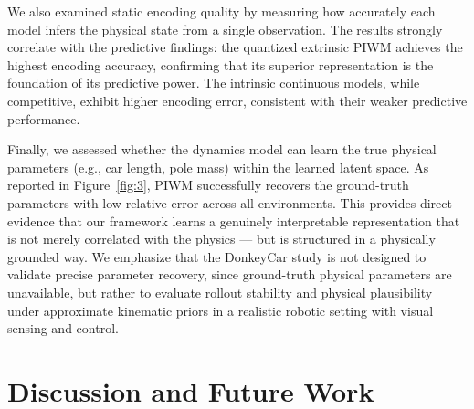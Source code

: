 \documentclass[nonacm,sigconf]{acmart}
\begin{document}
We also examined static encoding quality by measuring how accurately each model infers the physical state from a single observation. The results strongly correlate with the predictive findings: the quantized extrinsic PIWM achieves the highest encoding accuracy, confirming that its superior representation is the foundation of its predictive power. The intrinsic continuous models, while competitive, exhibit higher encoding error, consistent with their weaker predictive performance.

Finally, we assessed whether the dynamics model can learn the true physical parameters (e.g., car length, pole mass) within the learned latent space. As reported in Figure~\ref{fig:3}, PIWM successfully recovers the ground-truth parameters with low relative error across all environments. This provides direct evidence that our framework learns a genuinely interpretable representation that is not merely correlated with the physics --- but is structured in a physically grounded way. We emphasize that the DonkeyCar study is not designed to validate precise parameter recovery, since ground-truth physical parameters are unavailable, but rather to evaluate rollout stability and physical plausibility under approximate kinematic priors in a realistic robotic setting with visual sensing and control.






\section{Discussion and Future Work}\label{sec:dis}
\end{document}
